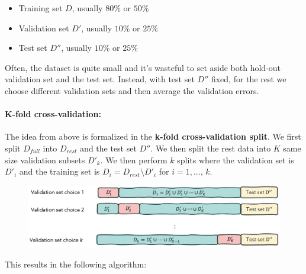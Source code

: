 \documentclass[a4paper]{extarticle}
\begin{document}
\begin{itemize}
    \item Training set \(D\), usually \(80\%\) or \(50\%\)
    \item Validation set \(D'\), usually \(10\%\) or \(25\%\)
    \item Test set \(D''\), usually \(10\%\) or \(25\%\)
\end{itemize}

Often, the dataset is quite small and it's wasteful to set aside both hold-out validation set and the test set. Instead, with test set \(D''\) fixed, for the rest we choose different validation sets and then average the validation errors.

\paragraph{K-fold cross-validation:} The idea from above is formalized in the \textbf{k-fold cross-validation split}. We first split \(D_{full}\) into \(D_{rest}\) and the test set \(D''\). We then split the rest data into \(K\) same size validation subsets \(D'_k\). We then perform \(k\) splits where the validation set is \(D'_i\) and the training set is \(D_i = D_{rest} \setminus D'_i\) for \(i = 1,..., \, k\).

\begin{figure}[H]
    \includegraphics[width=15cm]{../images/IntroML_Fig3-4}
    \centering
\end{figure}

This results in the following algorithm:
\end{document}
